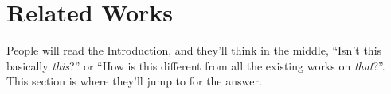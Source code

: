 \section{Related Works}\label{sec:related}

People will read the Introduction, and they'll think in the middle, ``Isn't this basically \emph{this}?'' or ``How is this different from all the existing works on \emph{that}?''.
This section is where they'll jump to for the answer.
